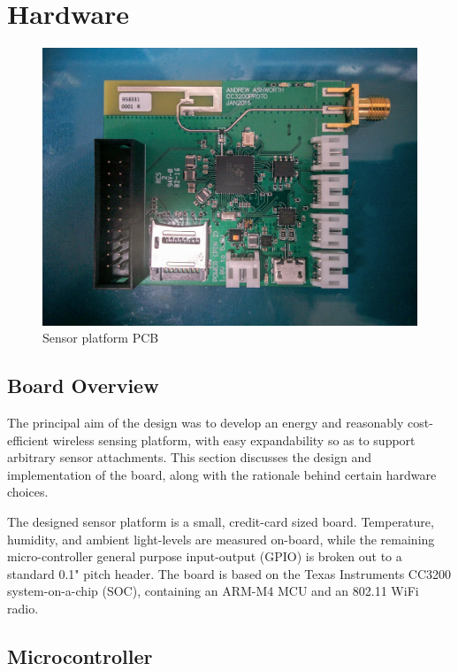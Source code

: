\chapter{Hardware}

\begin{figure}
\centering
\includegraphics[width=0.7\linewidth]{images/board.jpg}
\caption[Sensor board]{Sensor platform PCB}
\label{fig:board}
\end{figure}


\section{Board Overview}
The principal aim of the design was to develop an energy and reasonably cost-efficient wireless sensing platform, with easy expandability so as to support arbitrary sensor attachments. This section discusses the design and implementation of the board, along with the rationale behind certain hardware choices.

The designed sensor platform is a small, credit-card sized board. Temperature, humidity, and ambient light-levels are measured on-board, while the remaining micro-controller general purpose input-output (GPIO) is broken out to a standard 0.1" pitch header. The board is based on the Texas Instruments CC3200 system-on-a-chip (SOC), containing an ARM-M4 MCU and an 802.11 WiFi radio.

\section{Microcontroller}

